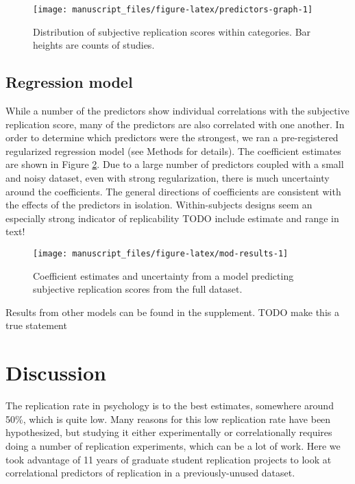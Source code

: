 \documentclass[
  english,
  a4paper,
]{article}
\begin{document}
\begin{figure}[ht]
\texttt{[image: manuscript\_files/figure-latex/predictors-graph-1]} \caption{Distribution of subjective replication scores within categories. Bar heights are counts of studies.}\label{fig:predictors-graph}
\end{figure}

\hypertarget{regression-model}{%
\subsection{Regression model}\label{regression-model}}

While a number of the predictors show individual correlations with the subjective replication score, many of the predictors are also correlated with one another. In order to determine which predictors were the strongest, we ran a pre-registered regularized regression model (see Methods for details). The coefficient estimates are shown in Figure \ref{fig:mod-results}. Due to a large number of predictors coupled with a small and noisy dataset, even with strong regularization, there is much uncertainty around the coefficients. The general directions of coefficients are consistent with the effects of the predictors in isolation. Within-subjects designs seem an especially strong indicator of replicability TODO include estimate and range in text!

\begin{figure}[ht]
\texttt{[image: manuscript\_files/figure-latex/mod-results-1]} \caption{Coefficient estimates and uncertainty from a model predicting subjective replication scores from the full dataset.}\label{fig:mod-results}
\end{figure}

Results from other models can be found in the supplement. TODO make this a true statement

\hypertarget{discussion}{%
\section{Discussion}\label{discussion}}

The replication rate in psychology is to the best estimates, somewhere around 50\%, which is quite low. Many reasons for this low replication rate have been hypothesized, but studying it either experimentally or correlationally requires doing a number of replication experiments, which can be a lot of work. Here we took advantage of 11 years of graduate student replication projects to look at correlational predictors of replication in a previously-unused dataset.
\end{document}

